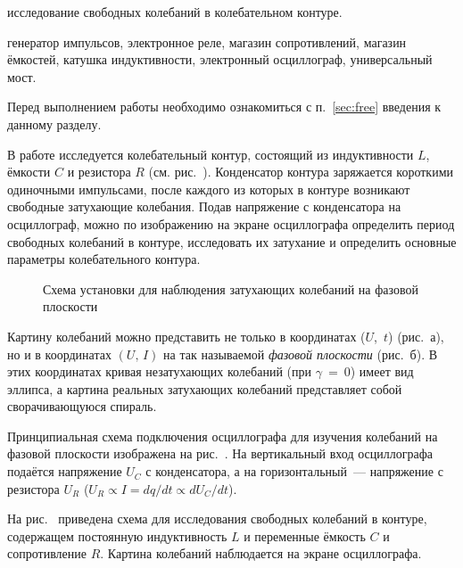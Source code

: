 
\begin{lab:aim}
исследование свободных колебаний в колебательном контуре.
\end{lab:aim}

\begin{lab:equipment}
генератор импульсов, электронное реле, магазин сопротивлений, магазин ёмкостей,
катушка индуктивности, электронный осциллограф, универсальный мост.
\end{lab:equipment}

Перед выполнением работы необходимо ознакомиться с п.~\ref{sec:free}
введения к данному разделу.

В работе исследуется колебательный контур, состоящий 
из индуктивности $L$, ёмкости $C$ и резистора $R$ (см. рис.~). 
Конденсатор контура заряжается короткими
одиночными импульсами, после каждого из которых в контуре возникают свободные
затухающие колебания. Подав напряжение с конденсатора на осциллограф, можно по
изображению на экране осциллографа определить период свободных колебаний в
контуре, исследовать их затухание и определить основные параметры колебательного
контура.

\begin{wrapfigure}[15]{r}{0.45\linewidth}
	\caption{Схема установки для наблюдения затухающих колебаний на фазовой
плоскости}
\end{wrapfigure}

Картину колебаний можно представить не только в координатах ($U$,~$t$)
(рис.~а), 
но и в координатах $(U,\,I)$ на так называемой \emph{фазовой плоскости} 
(рис.~б). В этих координатах кривая
незатухающих колебаний (при $\gamma~=~0$) имеет вид эллипса, а картина реальных
затухающих колебаний представляет собой сворачивающуюся спираль.

Принципиальная схема подключения осциллографа для изучения колебаний на фазовой
плоскости изображена на рис.~. На вертикальный вход
осциллографа подаётся напряжение $U_C$ с конденсатора, а на
горизонтальный~--- напряжение с резистора $U_R$ 
($U_R \propto I = dq/dt \propto dU_C/dt$).

\experiment 
На рис.~ приведена схема для исследования
свободных колебаний в контуре, содержащем постоянную индуктивность $L$ и
переменные ёмкость $C$ и сопротивление $R$. Картина колебаний наблюдается на
экране осциллографа.


